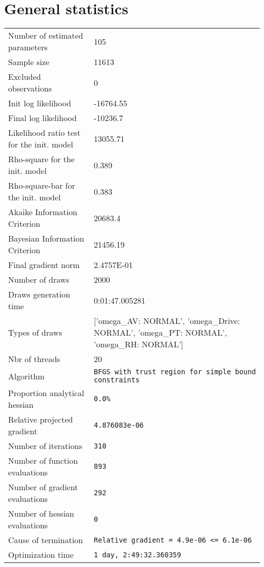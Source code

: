 



\section{General statistics}
\begin{tabular}{ll}
Number of estimated parameters & 105 \\
Sample size & 11613 \\
Excluded observations & 0 \\
Init log likelihood & -16764.55 \\
Final log likelihood & -10236.7 \\
Likelihood ratio test for the init. model & 13055.71 \\
Rho-square for the init. model & 0.389 \\
Rho-square-bar for the init. model & 0.383 \\
Akaike Information Criterion & 20683.4 \\
Bayesian Information Criterion & 21456.19 \\
Final gradient norm & 2.4757E-01 \\
Number of draws & 2000 \\
Draws generation time & 0:01:47.005281 \\
Types of draws & ['omega_AV: NORMAL', 'omega_Drive: NORMAL', 'omega_PT: NORMAL', 'omega_RH: NORMAL'] \\
Nbr of threads & 20 \\
Algorithm & \verb$BFGS with trust region for simple bound constraints$ \\
Proportion analytical hessian & \verb$0.0%$ \\
Relative projected gradient & \verb$4.876083e-06$ \\
Number of iterations & \verb$310$ \\
Number of function evaluations & \verb$893$ \\
Number of gradient evaluations & \verb$292$ \\
Number of hessian evaluations & \verb$0$ \\
Cause of termination & \verb$Relative gradient = 4.9e-06 <= 6.1e-06$ \\
Optimization time & \verb$1 day, 2:49:32.360359$ \\
\end{tabular}

